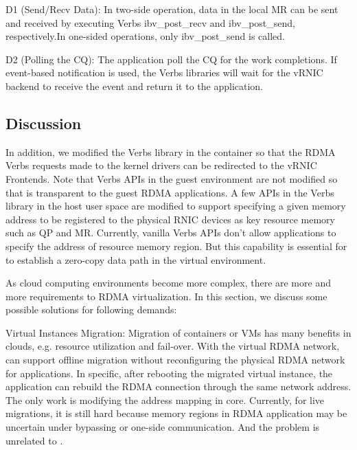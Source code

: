 D1 (Send/Recv Data): In two-side operation, data in the local MR can be sent and received by executing Verbs ibv\_post\_recv and ibv\_post\_send, respectively.In one-sided operations, only ibv\_post\_send is called.


D2 (Polling the CQ): The application poll the CQ for the work completions. If event-based notification is used, the Verbs libraries will wait for the vRNIC backend to receive the event and return it to the application.

\subsection{Discussion}

In addition, we modified the Verbs library in the container so that the RDMA Verbs requests made to the kernel drivers can be redirected to the vRNIC Frontends. Note that Verbs APIs in the guest environment are not modified so that \sys is transparent to the guest RDMA applications. A few APIs in the Verbs library in the host user space are modified to support specifying a given memory address to be registered to the physical RNIC devices as key resource memory such as QP and MR. Currently, vanilla Verbs APIs don't allow applications to specify the address of resource memory region. But this capability is essential for \sys to establish a zero-copy data path in the virtual environment.


As cloud computing environments become more complex, there are more and more  requirements to RDMA virtualization. In this section, we discuss some possible solutions for following demands:


Virtual Instances Migration:  Migration of containers or VMs has many benefits in clouds, e.g. resource utilization and fail-over. With the virtual RDMA network, \sys can support offline migration without reconfiguring the physical RDMA network for applications. In specific, after rebooting the migrated virtual instance, the application can rebuild the RDMA connection through the same network address. The only work is modifying the address mapping in \sys core. Currently, for live migrations, it is still hard because memory regions in RDMA application may be uncertain under bypassing or one-side communication. And the problem is unrelated to \sys.

